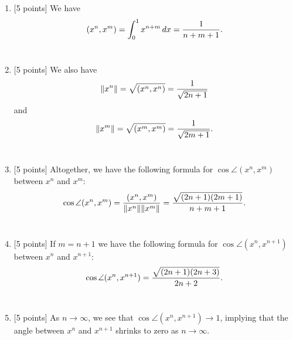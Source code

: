 \begin{solution}

\begin{enumerate}
\item {[5 points]} We have
\[ (x^n, x^m) = \int_0^1 x^{n+m}\, dx = {1\over n+m+1}.\]
\\
\item {[5 points]} We also have 
\[  \|x^n\| = \sqrt{(x^n, x^n)} = {1\over \sqrt{2n+1}}\]
and
\[  \|x^m\| = \sqrt{(x^m, x^m)} = {1\over \sqrt{2m+1}}.\]
\\
\item {[5 points]} Altogether, we have the following formula for $\cos \angle(x^n,x^m)$ between $x^n$ and $x^m$:
\[ \cos \angle(x^n,x^m) = {(x^n, x^m) \over \|x^n\| \|x^m\|}
               = {\sqrt{(2n+1)(2m+1)} \over n+m+1}.\]
\\
\item {[5 points]} If $m=n+1$ we have the following formula for $\cos \angle(x^n,x^{n+1})$ between $x^n$ and $x^{n+1}$:
\[ \cos \angle(x^n,x^{n+1}) = {\sqrt{(2n+1)(2n+3)} \over 2n+2}.\]
\\
\item {[5 points]} As $n\to\infty$, we see that $\cos \angle(x^n,x^{n+1}) \to 1$,
implying that the angle between $x^n$ and $x^{n+1}$ shrinks to zero as
$n\to\infty$.
\end{enumerate}

\end{solution}